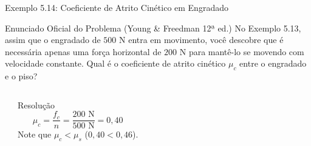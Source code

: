 \documentclass[10pt,aspectratio=169]{beamer}
\begin{document}
\begin{frame}{Exemplo 5.14: Coeficiente de Atrito Cinético em Engradado}
    \begin{block}{Enunciado Oficial do Problema (Young \& Freedman 12ª ed.)}
        \small
        No Exemplo 5.13, assim que o engradado de $500\text{ N}$ entra em movimento, você descobre que é necessária apenas uma força horizontal de $200\text{ N}$ para mantê-lo se movendo com velocidade constante. Qual é o coeficiente de atrito cinético $\mu_c$ entre o engradado e o piso?
    \end{block}
    \begin{columns}[T]
        \begin{center}
        \end{center}
        \begin{exampleblock}{Resolução}
            \small
            $$\mu_c = \frac{f_c}{n} = \frac{200\text{ N}}{500\text{ N}} = 0{,}40$$
            Note que $\mu_c < \mu_s$ ($0{,}40 < 0{,}46$).
        \end{exampleblock}
    \end{columns}
\end{frame}
\end{document}
